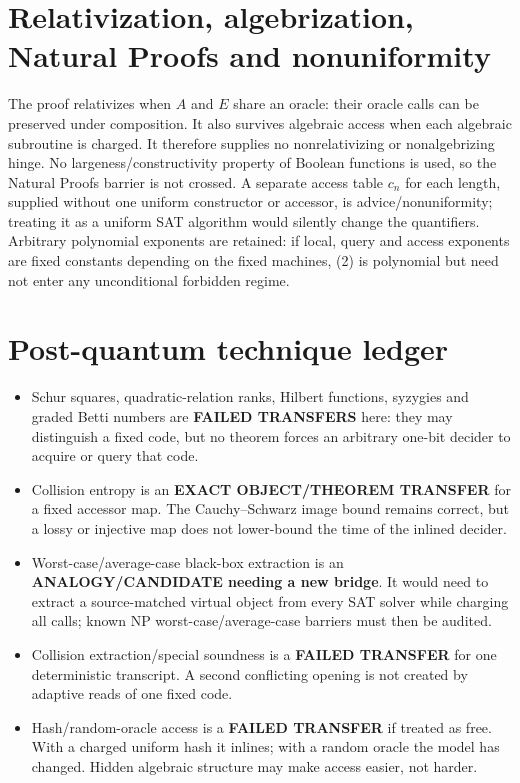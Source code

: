\documentclass[11pt]{article}
\begin{document}
\section{Relativization, algebrization, Natural Proofs and nonuniformity}
The proof relativizes when $A$ and $E$ share an oracle: their oracle calls can
be preserved under composition.  It also survives algebraic access when each
algebraic subroutine is charged.  It therefore supplies no nonrelativizing or
nonalgebrizing hinge.  No largeness/constructivity property of Boolean
functions is used, so the Natural Proofs barrier is not crossed.  A separate
access table $c_n$ for each length, supplied without one uniform constructor
or accessor, is advice/nonuniformity; treating it as a uniform SAT algorithm
would silently change the quantifiers.  Arbitrary polynomial exponents are
retained: if local, query and access exponents are fixed constants depending
on the fixed machines, (2) is polynomial but need not enter any unconditional
forbidden regime.

\section{Post-quantum technique ledger}
\begin{itemize}
\item Schur squares, quadratic-relation ranks, Hilbert functions, syzygies and
graded Betti numbers are \textbf{FAILED TRANSFERS} here: they may distinguish
a fixed code, but no theorem forces an arbitrary one-bit decider to acquire
or query that code.
\item Collision entropy is an \textbf{EXACT OBJECT/THEOREM TRANSFER} for a
fixed accessor map.  The Cauchy--Schwarz image bound remains correct, but a
lossy or injective map does not lower-bound the time of the inlined decider.
\item Worst-case/average-case black-box extraction is an
\textbf{ANALOGY/CANDIDATE needing a new bridge}.  It would need to extract a
source-matched virtual object from every SAT solver while charging all calls;
known NP worst-case/average-case barriers must then be audited.
\item Collision extraction/special soundness is a \textbf{FAILED TRANSFER}
for one deterministic transcript.  A second conflicting opening is not
created by adaptive reads of one fixed code.
\item Hash/random-oracle access is a \textbf{FAILED TRANSFER} if treated as
free.  With a charged uniform hash it inlines; with a random oracle the model
has changed.  Hidden algebraic structure may make access easier, not harder.
\end{itemize}
\end{document}
